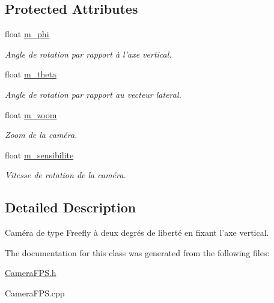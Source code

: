 \subsection*{Protected Attributes}
\begin{DoxyCompactItemize}
\item 
\hypertarget{classCameraFPS_adea819c2cc3cbe4d12153e18a61eef4d}{float \hyperlink{classCameraFPS_adea819c2cc3cbe4d12153e18a61eef4d}{m\+\_\+phi}}\label{classCameraFPS_adea819c2cc3cbe4d12153e18a61eef4d}

\begin{DoxyCompactList}\small\item\em Angle de rotation par rapport à l'axe vertical. \end{DoxyCompactList}\item 
\hypertarget{classCameraFPS_a9980f2a325bf21f2bbadf3d3caceebc5}{float \hyperlink{classCameraFPS_a9980f2a325bf21f2bbadf3d3caceebc5}{m\+\_\+theta}}\label{classCameraFPS_a9980f2a325bf21f2bbadf3d3caceebc5}

\begin{DoxyCompactList}\small\item\em Angle de rotation par rapport au vecteur lateral. \end{DoxyCompactList}\item 
\hypertarget{classCameraFPS_af473984bd2b269434960ec381b59682c}{float \hyperlink{classCameraFPS_af473984bd2b269434960ec381b59682c}{m\+\_\+zoom}}\label{classCameraFPS_af473984bd2b269434960ec381b59682c}

\begin{DoxyCompactList}\small\item\em Zoom de la caméra. \end{DoxyCompactList}\item 
\hypertarget{classCameraFPS_acf2f083c8757a1571165f4e8b6d3feba}{float \hyperlink{classCameraFPS_acf2f083c8757a1571165f4e8b6d3feba}{m\+\_\+sensibilite}}\label{classCameraFPS_acf2f083c8757a1571165f4e8b6d3feba}

\begin{DoxyCompactList}\small\item\em Vitesse de rotation de la caméra. \end{DoxyCompactList}\end{DoxyCompactItemize}


\subsection{Detailed Description}
Caméra de type Freefly à deux degrés de liberté en fixant l'axe vertical. 

The documentation for this class was generated from the following files\+:\begin{DoxyCompactItemize}
\item 
\hyperlink{CameraFPS_8h}{Camera\+F\+P\+S.\+h}\item 
Camera\+F\+P\+S.\+cpp\end{DoxyCompactItemize}
